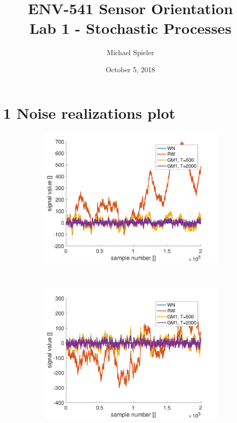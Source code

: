 \documentclass{article}
\title{ENV-541 Sensor Orientation\\Lab 1 - Stochastic Processes}
\author{Michael Spieler}
\date{October 5, 2018}
\begin{document}
\maketitle

\section*{1 Noise realizations plot}

\begin{figure}[H]
\centering
\begin{subfigure}[t]{0.49\textwidth}
\centering
\includegraphics[width=\textwidth]{signal1}
\end{subfigure}
~
\begin{subfigure}[t]{0.49\textwidth}
\centering
\includegraphics[width=\textwidth]{signal2}

\end{subfigure}
\end{figure}
\end{document}
